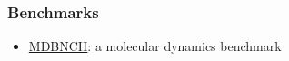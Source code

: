 \documentclass[a4paper,10pt,technote,compsoc,onecolumn]{IEEEtran}
\numberwithin{equation}{section}
\begin{document}
\subsubsection{Benchmarks}
\begin{itemize}
  \item \href{http://www.fisica.uniud.it/~ercolessi/mdbnch.html}{MDBNCH}: a
  molecular dynamics benchmark
\end{itemize}





\ifCLASSOPTIONcaptionsoff
  \newpage
\fi






% 

\end{document}
